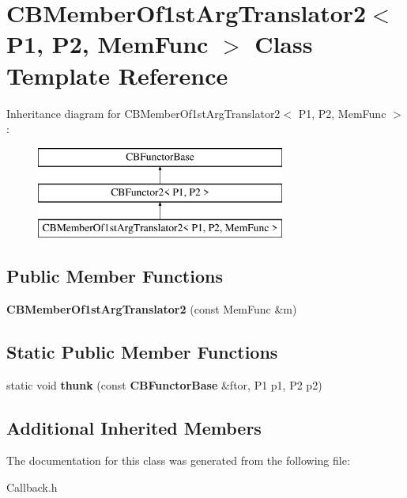 \section{C\+B\+Member\+Of1st\+Arg\+Translator2$<$ P1, P2, Mem\+Func $>$ Class Template Reference}
\label{classCBMemberOf1stArgTranslator2}
Inheritance diagram for C\+B\+Member\+Of1st\+Arg\+Translator2$<$ P1, P2, Mem\+Func $>$\+:\begin{figure}[H]
\begin{center}
\leavevmode
\includegraphics[height=3.000000cm]{classCBMemberOf1stArgTranslator2}
\end{center}
\end{figure}
\subsection*{Public Member Functions}
\begin{DoxyCompactItemize}
\item 
{\bfseries C\+B\+Member\+Of1st\+Arg\+Translator2} (const Mem\+Func \&m)\label{classCBMemberOf1stArgTranslator2_a023911cf50561084aba2161ee7c62833}

\end{DoxyCompactItemize}
\subsection*{Static Public Member Functions}
\begin{DoxyCompactItemize}
\item 
static void {\bfseries thunk} (const {\bf C\+B\+Functor\+Base} \&ftor, P1 p1, P2 p2)\label{classCBMemberOf1stArgTranslator2_a19f52a3dbdd607f7ecd1a9096579a22e}

\end{DoxyCompactItemize}
\subsection*{Additional Inherited Members}


The documentation for this class was generated from the following file\+:\begin{DoxyCompactItemize}
\item 
Callback.\+h\end{DoxyCompactItemize}
